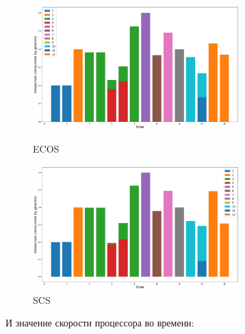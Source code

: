 \documentclass{article}
\begin{document}
\begin{figure}[h]
\begin{center}
\begin{minipage}[h]{8cm}
\includegraphics[width=8cm]{ECOS_2.png}
\caption{ECOS} %
\label{ris:experimoriginal} %
\end{minipage}
\hfill 
\begin{minipage}[h]{8cm}
\includegraphics[width=8cm]{SCS_2.png}
\caption{SCS}
\label{ris:experimcoded}
\end{minipage}
\end{center}
\end{figure}

И значение скорости процессора во времени:\\
\end{document}
